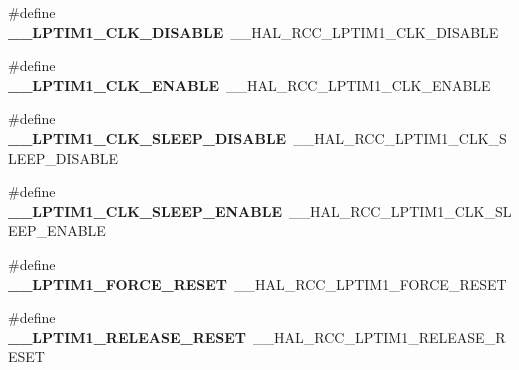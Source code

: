 \begin{DoxyCompactItemize}
\item 
\hypertarget{group___h_a_l___r_c_c___aliased_ga8fe43bce0133b27a915fb7bac43c54dc}{\#define {\bfseries \-\_\-\-\_\-\-L\-P\-T\-I\-M1\-\_\-\-C\-L\-K\-\_\-\-D\-I\-S\-A\-B\-L\-E}~\-\_\-\-\_\-\-H\-A\-L\-\_\-\-R\-C\-C\-\_\-\-L\-P\-T\-I\-M1\-\_\-\-C\-L\-K\-\_\-\-D\-I\-S\-A\-B\-L\-E}\label{group___h_a_l___r_c_c___aliased_ga8fe43bce0133b27a915fb7bac43c54dc}

\item 
\hypertarget{group___h_a_l___r_c_c___aliased_gae24b86ed5b928dd5f5702e92a28547cf}{\#define {\bfseries \-\_\-\-\_\-\-L\-P\-T\-I\-M1\-\_\-\-C\-L\-K\-\_\-\-E\-N\-A\-B\-L\-E}~\-\_\-\-\_\-\-H\-A\-L\-\_\-\-R\-C\-C\-\_\-\-L\-P\-T\-I\-M1\-\_\-\-C\-L\-K\-\_\-\-E\-N\-A\-B\-L\-E}\label{group___h_a_l___r_c_c___aliased_gae24b86ed5b928dd5f5702e92a28547cf}

\item 
\hypertarget{group___h_a_l___r_c_c___aliased_ga2794aea3c932ca4bd7d2e001f7e8ce0a}{\#define {\bfseries \-\_\-\-\_\-\-L\-P\-T\-I\-M1\-\_\-\-C\-L\-K\-\_\-\-S\-L\-E\-E\-P\-\_\-\-D\-I\-S\-A\-B\-L\-E}~\-\_\-\-\_\-\-H\-A\-L\-\_\-\-R\-C\-C\-\_\-\-L\-P\-T\-I\-M1\-\_\-\-C\-L\-K\-\_\-\-S\-L\-E\-E\-P\-\_\-\-D\-I\-S\-A\-B\-L\-E}\label{group___h_a_l___r_c_c___aliased_ga2794aea3c932ca4bd7d2e001f7e8ce0a}

\item 
\hypertarget{group___h_a_l___r_c_c___aliased_ga517cc9953c8cdb3b4ea249401bf2cf3b}{\#define {\bfseries \-\_\-\-\_\-\-L\-P\-T\-I\-M1\-\_\-\-C\-L\-K\-\_\-\-S\-L\-E\-E\-P\-\_\-\-E\-N\-A\-B\-L\-E}~\-\_\-\-\_\-\-H\-A\-L\-\_\-\-R\-C\-C\-\_\-\-L\-P\-T\-I\-M1\-\_\-\-C\-L\-K\-\_\-\-S\-L\-E\-E\-P\-\_\-\-E\-N\-A\-B\-L\-E}\label{group___h_a_l___r_c_c___aliased_ga517cc9953c8cdb3b4ea249401bf2cf3b}

\item 
\hypertarget{group___h_a_l___r_c_c___aliased_gaef3ee46d85a0a59c82eb8ef772c8061a}{\#define {\bfseries \-\_\-\-\_\-\-L\-P\-T\-I\-M1\-\_\-\-F\-O\-R\-C\-E\-\_\-\-R\-E\-S\-E\-T}~\-\_\-\-\_\-\-H\-A\-L\-\_\-\-R\-C\-C\-\_\-\-L\-P\-T\-I\-M1\-\_\-\-F\-O\-R\-C\-E\-\_\-\-R\-E\-S\-E\-T}\label{group___h_a_l___r_c_c___aliased_gaef3ee46d85a0a59c82eb8ef772c8061a}

\item 
\hypertarget{group___h_a_l___r_c_c___aliased_gad894e461dd243be2f7107de7b94d5e4f}{\#define {\bfseries \-\_\-\-\_\-\-L\-P\-T\-I\-M1\-\_\-\-R\-E\-L\-E\-A\-S\-E\-\_\-\-R\-E\-S\-E\-T}~\-\_\-\-\_\-\-H\-A\-L\-\_\-\-R\-C\-C\-\_\-\-L\-P\-T\-I\-M1\-\_\-\-R\-E\-L\-E\-A\-S\-E\-\_\-\-R\-E\-S\-E\-T}\label{group___h_a_l___r_c_c___aliased_gad894e461dd243be2f7107de7b94d5e4f}


\end{DoxyCompactItemize}
